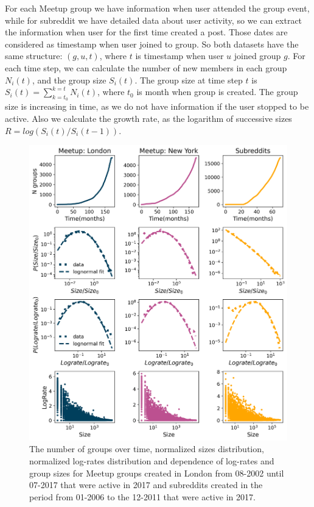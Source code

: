 For each Meetup group we have information when user attended the group event, while for subreddit we have detailed data about user activity, so we can extract the information when user for the first time created a post. Those dates are considered as timestamp when user joined to group. So both datasets have the same structure: $(g, u, t)$, where $t$ is timestamp when user $u$ joined group $g$. For each time step, we can calculate the number of new members in each group $N_i(t)$, and the group size $S_{i}(t)$. The group size at time step $t$ is $S_{i}(t)=\sum^{k=t}_{k=t_{0}}N_{i}(t)$, where $t_0$ is month when group is created. The group size is increasing in time, as we do not have information if the user stopped to be active. Also we calculate the growth rate, as the logarithm of successive sizes $R = log(S_{i}(t)/S_{i}(t-1))$.

\begin{figure}[h]
	\centering
	\includegraphics[width=0.8\linewidth]{Figures/figures/Fig2.png}
	\caption{The number of groups over time, normalized sizes distribution, normalized log-rates distribution and dependence of log-rates and group sizes for Meetup groups created in London from 08-2002 until 07-2017 that were active in 2017 and subreddits created in the period from 01-2006 to the  12-2011 that were active in 2017. }
	\label{fig:data1}
\end{figure}   

